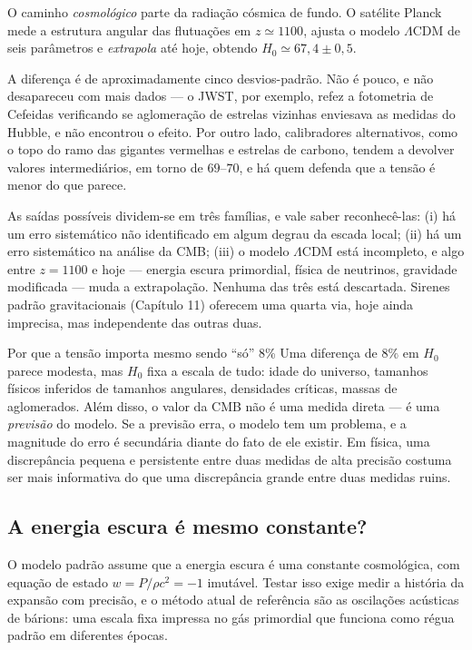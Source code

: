 \documentclass[11pt,a4paper]{article}
\begin{document}
O caminho \emph{cosmológico} parte da radiação cósmica de fundo. O satélite Planck mede a estrutura angular das flutuações em $z\simeq1100$, ajusta o modelo $\Lambda$CDM de seis parâmetros e \emph{extrapola} até hoje, obtendo $H_0\simeq67{,}4\pm0{,}5$.

A diferença é de aproximadamente cinco desvios-padrão. Não é pouco, e não desapareceu com mais dados --- o JWST, por exemplo, refez a fotometria de Cefeidas verificando se aglomeração de estrelas vizinhas enviesava as medidas do Hubble, e não encontrou o efeito. Por outro lado, calibradores alternativos, como o topo do ramo das gigantes vermelhas e estrelas de carbono, tendem a devolver valores intermediários, em torno de $69$--$70$, e há quem defenda que a tensão é menor do que parece.

As saídas possíveis dividem-se em três famílias, e vale saber reconhecê-las: (i) há um erro sistemático não identificado em algum degrau da escada local; (ii) há um erro sistemático na análise da CMB; (iii) o modelo $\Lambda$CDM está incompleto, e algo entre $z=1100$ e hoje --- energia escura primordial, física de neutrinos, gravidade modificada --- muda a extrapolação. Nenhuma das três está descartada. Sirenes padrão gravitacionais (Capítulo 11) oferecem uma quarta via, hoje ainda imprecisa, mas independente das outras duas.

\begin{lessonblock}[borderline west={2pt}{0pt}{astroGold}]{Por que a tensão importa mesmo sendo ``só'' 8\%}
Uma diferença de $8\%$ em $H_0$ parece modesta, mas $H_0$ fixa a escala de tudo: idade do universo, tamanhos físicos inferidos de tamanhos angulares, densidades críticas, massas de aglomerados. Além disso, o valor da CMB não é uma medida direta --- é uma \emph{previsão} do modelo. Se a previsão erra, o modelo tem um problema, e a magnitude do erro é secundária diante do fato de ele existir. Em física, uma discrepância pequena e persistente entre duas medidas de alta precisão costuma ser mais informativa do que uma discrepância grande entre duas medidas ruins.
\end{lessonblock}

\subsection*{A energia escura é mesmo constante?}

O modelo padrão assume que a energia escura é uma constante cosmológica, com equação de estado $w=P/\rho c^2=-1$ imutável. Testar isso exige medir a história da expansão com precisão, e o método atual de referência são as oscilações acústicas de bárions: uma escala fixa impressa no gás primordial que funciona como régua padrão em diferentes épocas.
\end{document}
